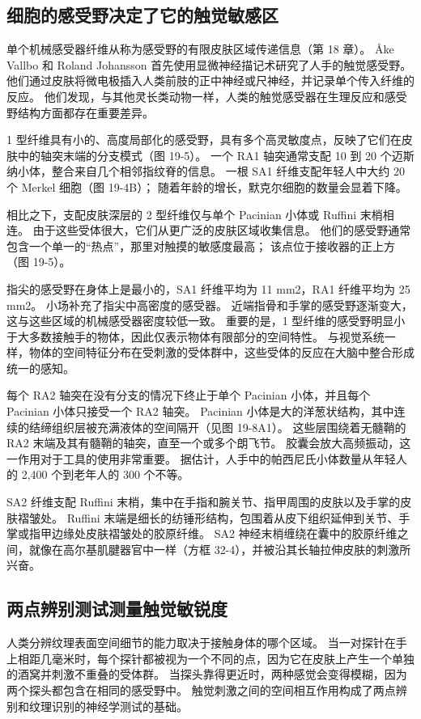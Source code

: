 \subsection{细胞的感受野决定了它的触觉敏感区}
单个机械感受器纤维从称为感受野的有限皮肤区域传递信息（第 18 章）。 Åke Vallbo 和 Roland Johansson 首先使用显微神经描记术研究了人手的触觉感受野。 他们通过皮肤将微电极插入人类前肢的正中神经或尺神经，并记录单个传入纤维的反应。 他们发现，与其他灵长类动物一样，人类的触觉感受器在生理反应和感受野结构方面都存在重要差异。

1 型纤维具有小的、高度局部化的感受野，具有多个高灵敏度点，反映了它们在皮肤中的轴突末端的分支模式（图 19-5）。 一个 RA1 轴突通常支配 10 到 20 个迈斯纳小体，整合来自几个相邻指纹脊的信息。 一根 SA1 纤维支配年轻人中大约 20 个 Merkel 细胞（图 19-4B）； 随着年龄的增长，默克尔细胞的数量会显着下降。

相比之下，支配皮肤深层的 2 型纤维仅与单个 Pacinian 小体或 Ruffini 末梢相连。 由于这些受体很大，它们从更广泛的皮肤区域收集信息。 他们的感受野通常包含一个单一的“热点”，那里对触摸的敏感度最高； 该点位于接收器的正上方（图 19-5）。

指尖的感受野在身体上是最小的，SA1 纤维平均为 11 mm2，RA1 纤维平均为 25 mm2。 小场补充了指尖中高密度的感受器。 近端指骨和手掌的感受野逐渐变大，这与这些区域的机械感受器密度较低一致。 重要的是，1 型纤维的感受野明显小于大多数接触手的物体，因此仅表示物体有限部分的空间特性。 与视觉系统一样，物体的空间特征分布在受刺激的受体群中，这些受体的反应在大脑中整合形成统一的感知。

每个 RA2 轴突在没有分支的情况下终止于单个 Pacinian 小体，并且每个 Pacinian 小体只接受一个 RA2 轴突。 Pacinian 小体是大的洋葱状结构，其中连续的结缔组织层被充满液体的空间隔开（见图 19-8A1）。 这些层围绕着无髓鞘的 RA2 末端及其有髓鞘的轴突，直至一个或多个朗飞节。 胶囊会放大高频振动，这一作用对于工具的使用非常重要。 据估计，人手中的帕西尼氏小体数量从年轻人的 2,400 个到老年人的 300 个不等。

SA2 纤维支配 Ruffini 末梢，集中在手指和腕关节、指甲周围的皮肤以及手掌的皮肤褶皱处。 Ruffini 末端是细长的纺锤形结构，包围着从皮下组织延伸到关节、手掌或指甲边缘处皮肤褶皱处的胶原纤维。 SA2 神经末梢缠绕在囊中的胶原纤维之间，就像在高尔基肌腱器官中一样（方框 32-4），并被沿其长轴拉伸皮肤的刺激所兴奋。


\subsection{两点辨别测试测量触觉敏锐度}
人类分辨纹理表面空间细节的能力取决于接触身体的哪个区域。 当一对探针在手上相距几毫米时，每个探针都被视为一个不同的点，因为它在皮肤上产生一个单独的酒窝并刺激不重叠的受体群。 当探头靠得更近时，两种感觉会变得模糊，因为两个探头都包含在相同的感受野中。 触觉刺激之间的空间相互作用构成了两点辨别和纹理识别的神经学测试的基础。

